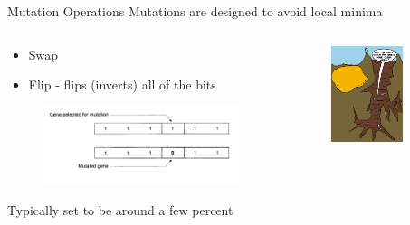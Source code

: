 \begin{frame}{Mutation Operations}
Mutations are designed to avoid local minima
\begin{columns}
\begin{column}{0.45\textwidth}
  \begin{itemize}
    \item Swap
    \item Flip - flips (inverts) all of the bits
  \end{itemize}
    \begin{figure}
      \centering
      \includegraphics[width=0.4\textheight]{mutation_example.png}
    \end{figure}
	Typically set to be around a few percent
\end{column}
\begin{column}{0.45\textwidth}
\begin{figure}
	\centering
	\includegraphics[width=0.75\textwidth]{AllTheBestWork.png}
\end{figure}

\end{column}
\end{columns}
\end{frame}
